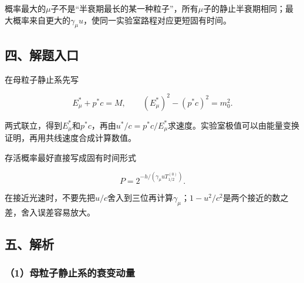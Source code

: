 \documentclass[12pt,a4paper,fontset=fandol]{ctexart}
\begin{document}
\begin{center}
\begin{minipage}{\linewidth}
\centering\begingroup{}
\ifdim\wd\diagrambox>.88\linewidth
\sbox{\diagrambox}{\resizebox{.88\linewidth}{!}{\usebox{\diagrambox}}}\fi
\ifdim\ht\diagrambox>.38\textheight
\resizebox{!}{.38\textheight}{\usebox{\diagrambox}}
\else\usebox{\diagrambox}\fi
\par{}\endgroup\end{minipage}\end{center}

概率最大的\(\mu\)子不是``半衰期最长的某一种粒子''，所有\(\mu\)子的静止半衰期相同；最大概率来自更大的\(\gamma_\mu u\)，使同一实验室路程对应更短固有时间。

\subsection{四、解题入口}\label{ux56dbux89e3ux9898ux5165ux53e3-5}

在母粒子静止系先写

\[
E_\mu^*+p^*c=M,\qquad
(E_\mu^*)^2-(p^*c)^2=m_0^2.
\]

两式联立，得到\(E_\mu^*\)和\(p^*c\)，再由\(u^*/c=p^*c/E_\mu^*\)求速度。实验室极值可以由能量变换证明，再用共线速度合成计算数值。

存活概率最好直接写成固有时间形式

\[
P=2^{-h/(\gamma_\mu uT_{1/2}^{(0)})}.
\]

在接近光速时，不要先把\(u/c\)舍入到三位再计算\(\gamma_\mu\)；\(1-u^2/c^2\)是两个接近的数之差，舍入误差容易放大。

\subsection{五、解析}\label{ux4e94ux89e3ux6790-5}

\subsubsection{（1）母粒子静止系的衰变动量}\label{ux6bcdux7c92ux5b50ux9759ux6b62ux7cfbux7684ux8870ux53d8ux52a8ux91cf}
\end{document}
